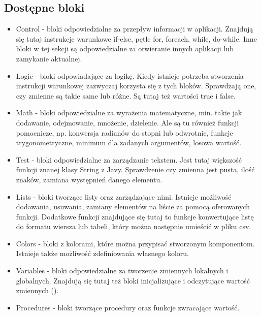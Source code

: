 \subsection{Dostępne bloki}

\begin{itemize}

\item Control - bloki odpowiedzialne za przepływ informacji w aplikacji. Znajdują się tutaj instrukcje warunkowe if-else, pętle for, foreach, while, do-while. Inne bloki w tej sekcji są odpowiedzialne za otwieranie innych aplikacji lub zamykanie aktualnej.

\item Logic - bloki odpowiadające za logikę. Kiedy istnieje potrzeba stworzenia instrukcji warunkowej zazwyczaj korzysta się z tych bloków. Sprawdzają one, czy zmienne są takie same lub różne. Są tutaj też wartości true i false.

\item Math - bloki odpowiedzialne za wyrażenia matematyczne, min. takie jak dodawanie, odejmowanie, mnożenie, dzielenie. Ale są tu również funkcji pomocnicze, np. konwersja radianów do stopni lub odwrotnie, funkcje trygonometryczne, minimum dla zadanych argumentów, losowa wartość.

\item Test - bloki odpowiedzialne za zarządzanie tekstem. Jest tutaj większość funkcji znanej klasy String z Javy. Sprawdzenie czy zmienna jest pusta, ilość znaków, zamiana występnień danego elementu.

\item Lists - bloki tworzące listy oraz zarządzające nimi. Istnieje możliwość dodawania, usuwania, zamiany elementów na liście za pomocą oferowanych funkcji. Dodatkowe funkcji znajdujące się tutaj to funkcje konwertujące listę do formatu wiersza lub tabeli, który można następnie umieścić w pliku csv.

\item Colors - bloki z kolorami, które można przypisać stworzonym komponentom. Istnieje także możliwość zdefiniowania własnego koloru.

\item Variables - bloki odpowiedzialne za tworzenie zmiennych lokalnych i globalnych. Znajdują się tutaj też bloki inicjalizujące i odczytujące wartość zmiennych ().

\item Procedures - bloki tworzące procedury oraz funkcje zwracające wartość.

\end{itemize}

